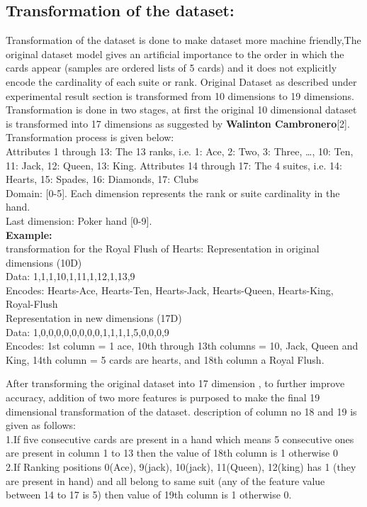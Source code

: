 \documentclass[11pt, oneside]{article}   	%
\begin{document}
\subsection{Transformation of the dataset:}
Transformation of the dataset is done to make dataset more machine friendly,The original dataset model gives an artificial importance to the order in which the cards appear (samples are ordered lists of 5 cards) and it does not explicitly encode the cardinality of each suite or rank.
Original Dataset as described under experimental result section is transformed from 10 dimensions to 19 dimensions. Transformation is done in two stages, at first the original 10 dimensional dataset is transformed into 17 dimensions as suggested by \textbf{Walinton Cambronero}[2].\\ Transformation process is given below:\\
Attributes 1 through 13: The 13 ranks, i.e. 1: Ace, 2: Two, 3:
Three, …, 10: Ten, 11: Jack, 12: Queen, 13: King.
Attributes 14 through 17: The 4 suites, i.e. 14: Hearts, 15:
Spades, 16: Diamonds, 17: Clubs\\
Domain: [0-5]. Each dimension represents the rank or suite
cardinality in the hand.\\
Last dimension: Poker hand [0-9].
\\
\textbf{Example:} \\transformation for the Royal Flush of Hearts:
Representation in original dimensions (10D)\\
Data: 1,1,1,10,1,11,1,12,1,13,9\\
Encodes: Hearts-Ace, Hearts-Ten, Hearts-Jack, Hearts-Queen,
Hearts-King, Royal-Flush\\
Representation in new dimensions (17D)\\
Data: 1,0,0,0,0,0,0,0,0,1,1,1,1,5,0,0,0,9\\
Encodes: 1st column = 1 ace, 10th through 13th columns =
10, Jack, Queen and King, 14th column = 5 cards are hearts,
and 18th column a Royal Flush.

After transforming the original dataset into 17 dimension , to further improve accuracy, addition of two more features is purposed to make the final 19 dimensional transformation of the dataset.
description of column no 18 and 19 is given as follows:\\
1.If five consecutive cards are present in a hand which means 5 consecutive ones are present in column 1 to 13 then the value of 18th column is 1 otherwise 0\\
2.If Ranking positions 0(Ace), 9(jack), 10(jack), 11(Queen), 12(king) has 1 (they are present in hand) and all belong to same suit (any of the feature value between 14 to 17 is 5) then value of 19th column is 1 otherwise 0.
\end{document}
